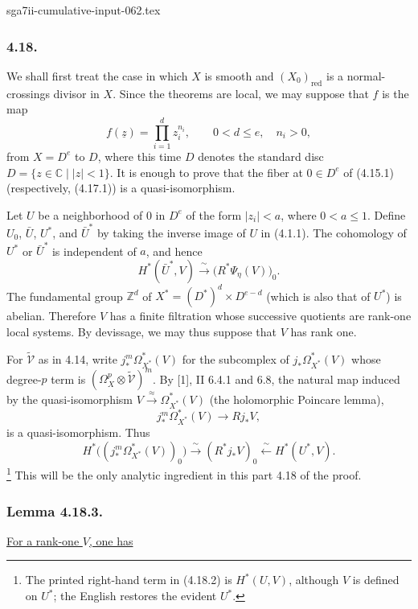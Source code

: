 \begin{filecontents*}{sga7ii-cumulative-input-062.tex}
\subsubsection*{4.18.}
We shall first treat the case in which $X$ is smooth and
$(X_0)_{\mathrm{red}}$ is a normal-crossings divisor in $X$.  Since
the theorems are local, we may suppose that $f$ is the map
\[
f(\underline z)=\prod_{i=1}^d z_i^{n_i},
\qquad 0<d\leq e,\quad n_i>0,
\]
from $X=D^e$ to $D$, where this time $D$ denotes the standard disc
$D=\{z\in\mathbb C\mid |z|<1\}$.  It is enough to prove that the
fiber at $0\in D^e$ of (4.15.1) (respectively, (4.17.1)) is a
quasi-isomorphism.

Let $U$ be a neighborhood of $0$ in $D^e$ of the form
$|z_i|<a$, where $0<a\leq1$.  Define $U_0$, $\bar U$, $U^*$, and
$\bar U^*$ by taking the inverse image of $U$ in (4.1.1).  The
cohomology of $U^*$ or $\bar U^*$ is independent of $a$, and hence
\[
H^*(\bar U^*,V)\xrightarrow{\ \sim\ }
  \bigl(R^*\Psi_\eta(V)\bigr)_0.
\]
The fundamental group $\mathbb Z^d$ of
$X^*=(D^*)^d\times D^{e-d}$ (which is also that of $U^*$) is
abelian.  Therefore $V$ has a finite filtration whose successive
quotients are rank-one local systems.  By devissage, we may thus
suppose that $V$ has rank one.

For $\widetilde{\mathcal V}$ as in 4.14, write
$j_*^m\Omega_{X^*}^*(V)$ for the subcomplex of
$j_*\Omega_{X^*}^*(V)$ whose degree-$p$ term is
$(\Omega_X^p\otimes\widetilde{\mathcal V})^m$.  By [1], II 6.4.1
and 6.8, the natural map induced by the quasi-isomorphism
$V\xrightarrow{\ \approx\ }\Omega_{X^*}^*(V)$ (the holomorphic
Poincare lemma),
\begin{equation}\tag{4.18.1}
j_*^m\Omega_{X^*}^*(V)\longrightarrow Rj_*V,
\end{equation}
is a quasi-isomorphism.  Thus
\begin{equation}\tag{4.18.2}
H^*\bigl((j_*^m\Omega_{X^*}^*(V))_0\bigr)
 \xrightarrow{\ \sim\ }(R^*j_*V)_0
 \xleftarrow{\ \sim\ }H^*(U^*,V).
\end{equation}
\footnote{The printed right-hand term in (4.18.2) is $H^*(U,V)$,
although $V$ is defined on $U^*$; the English restores the evident
$U^*$.}
This will be the only analytic ingredient in this part 4.18 of the
proof.

\subsubsection*{Lemma 4.18.3.}
\underline{For a rank-one $V$, one has}


\end{filecontents*}
